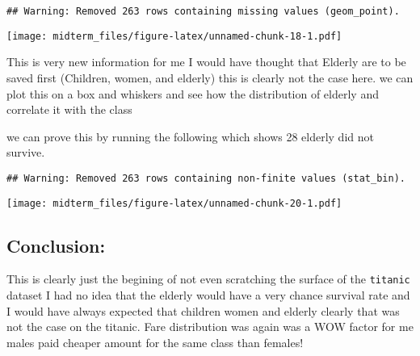 \documentclass[]{article}
\newenvironment{Shaded}{\begin{snugshade}}{\end{snugshade}}
\newcommand{\DataTypeTok}[1]{\textcolor[rgb]{0.13,0.29,0.53}{#1}}
\newcommand{\DecValTok}[1]{\textcolor[rgb]{0.00,0.00,0.81}{#1}}
\newcommand{\KeywordTok}[1]{\textcolor[rgb]{0.13,0.29,0.53}{\textbf{#1}}}
\newcommand{\NormalTok}[1]{#1}
\newcommand{\OperatorTok}[1]{\textcolor[rgb]{0.81,0.36,0.00}{\textbf{#1}}}
\newcommand{\StringTok}[1]{\textcolor[rgb]{0.31,0.60,0.02}{#1}}
\begin{document}
\begin{verbatim}
## Warning: Removed 263 rows containing missing values (geom_point).
\end{verbatim}

\texttt{[image: midterm\_files/figure-latex/unnamed-chunk-18-1.pdf]}

This is very new information for me I would have thought that Elderly
are to be saved first (Children, women, and elderly) this is clearly not
the case here. we can plot this on a box and whiskers and see how the
distribution of elderly and correlate it with the class

we can prove this by running the following which shows 28 elderly did
not survive.

\begin{Shaded}
\end{Shaded}

\begin{Shaded}
\end{Shaded}

\begin{verbatim}
## Warning: Removed 263 rows containing non-finite values (stat_bin).
\end{verbatim}

\texttt{[image: midterm\_files/figure-latex/unnamed-chunk-20-1.pdf]}

\hypertarget{conclusion}{%
\subsection{Conclusion:}\label{conclusion}}

This is clearly just the begining of not even scratching the surface of
the \texttt{titanic} dataset I had no idea that the elderly would have a
very chance survival rate and I would have always expected that children
women and elderly clearly that was not the case on the titanic. Fare
distribution was again was a WOW factor for me males paid cheaper amount
for the same class than females!
\end{document}
